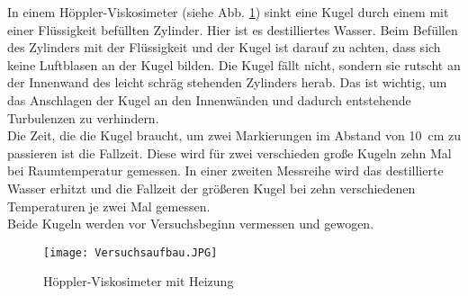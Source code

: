 In einem Höppler-Viskosimeter (siehe Abb. \ref{fig:aufbau}) sinkt eine Kugel durch einem mit einer Flüssigkeit befüllten Zylinder. Hier ist es destilliertes Wasser. Beim Befüllen des Zylinders mit der Flüssigkeit und der Kugel ist darauf zu achten, dass sich keine Luftblasen an der Kugel bilden. Die Kugel fällt nicht, sondern sie rutscht an der Innenwand des leicht schräg stehenden  Zylinders herab. Das ist wichtig, um das Anschlagen der Kugel an den Innenwänden und dadurch entstehende Turbulenzen zu verhindern. \\
Die Zeit, die die Kugel braucht, um zwei Markierungen im Abstand von \SI{10}{\centi\meter} zu passieren ist die Fallzeit. Diese wird für zwei verschieden große Kugeln zehn Mal bei Raumtemperatur gemessen. 
In einer zweiten Messreihe wird das destillierte Wasser erhitzt und die Fallzeit der größeren Kugel bei zehn verschiedenen Temperaturen je zwei Mal gemessen. \\
Beide Kugeln werden vor Versuchsbeginn vermessen und gewogen. \\

\begin{figure}[h!]
	\centering
	\texttt{[image: Versuchsaufbau.JPG]}
	\caption{Höppler-Viskosimeter mit Heizung}
	\label{fig:aufbau}
\end{figure}

 
 